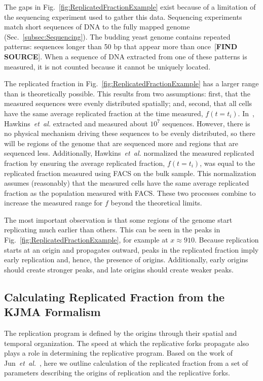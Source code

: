 		The gaps in Fig.~\ref{fig:ReplicatedFractionExample} exist because of a limitation of the sequencing experiment used to gather this data.
		Sequencing experiments match short sequences of DNA to the fully mapped genome (Sec.~\ref{subsec:Sequencing}).
		The budding yeast genome contains repeated patterns: sequences longer than 50 bp that appear more than once~[\textbf{FIND SOURCE}].
		When a sequence of DNA extracted from one of these patterns is measured, it is not counted because it cannot be uniquely located.
		
		The replicated fraction in Fig.~\ref{fig:ReplicatedFractionExample} has a larger range than is theoretically possible.
		This results from two assumptions: first, that the measured sequences were evenly distributed spatially; and, second, that all cells have the same average replicated fraction at the time measured, $f(t=t_i)$.
		In~\cite{StochasticTermination}, Hawkins~\emph{et~al.} extracted and measured about $10^7$ sequences.
		However, there is no physical mechanism driving these sequences to be evenly distributed, so there will be regions of the genome that are sequenced more and regions that are sequenced less.
		Additionally, Hawkins~\emph{et~al.} normalized the measured replicated fraction by ensuring the average replicated fraction, $f(t=t_i)$, was equal to the replicated fraction measured using FACS on the bulk sample.
		This normalization assumes (reasonably) that the measured cells have the same average replicated fraction as the population measured with FACS.
		These two processes combine to increase the measured range for $f$ beyond the theoretical limits.
		
		The most important observation is that some regions of the genome start replicating much earlier than others.
		This can be seen in the peaks in Fig.~\ref{fig:ReplicatedFractionExample}, for example at $x \approx 910$.
		Because replication starts at an origin and propagates outward, peaks in the replicated fraction imply early replication and, hence, the presence of origins.
		Additionally, early origins should create stronger peaks, and late origins should create weaker peaks.
		
		
		\subsection{Calculating Replicated Fraction from the KJMA Formalism}
		\label{subsec:KJMA}
		
		The replication program is defined by the origins through their spatial and temporal organization.
		The speed at which the replicative forks propagate also plays a role in determining the replicative program.
		Based on the work of Jun~\emph{et~al.}~\cite{KJMA1}, here we outline calculation of the replicated fraction from a set of parameters describing the origins of replication and the replicative forks.
		
